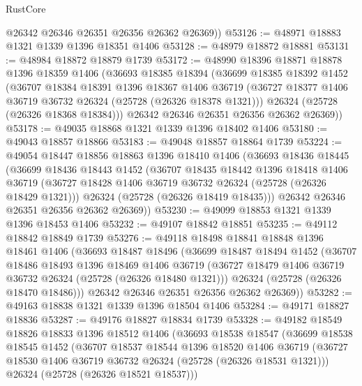\begin{lexlean}{RustCore}
\begin{coremodule}
        @26342
        @26346
        @26351
        @26356
        @26362
        @26369))
@53126 := @48971 @18883 @1321 @1339 @1396 @18351 @1406
@53128 := @48979 @18872 @18881
@53131 := @48984 @18872 @18879 @1739
@53172 := @48990
    @18396
    @18871
    @18878
    @1396
    @18359
    @1406
    (@36693
      @18385
      @18394
      (@36699
        @18385
        @18392
        @1452
        (@36707
          @18384
          @18391
          @1396
          @18367
          @1406
          @36719
          (@36727 @18377 @1406 @36719 @36732 @26324 (@25728 (@26326 @18378 @1321)))
          @26324
          (@25728 (@26326 @18368 @18384)))
        @26342
        @26346
        @26351
        @26356
        @26362
        @26369))
@53178 := @49035 @18868 @1321 @1339 @1396 @18402 @1406
@53180 := @49043 @18857 @18866
@53183 := @49048 @18857 @18864 @1739
@53224 := @49054
    @18447
    @18856
    @18863
    @1396
    @18410
    @1406
    (@36693
      @18436
      @18445
      (@36699
        @18436
        @18443
        @1452
        (@36707
          @18435
          @18442
          @1396
          @18418
          @1406
          @36719
          (@36727 @18428 @1406 @36719 @36732 @26324 (@25728 (@26326 @18429 @1321)))
          @26324
          (@25728 (@26326 @18419 @18435)))
        @26342
        @26346
        @26351
        @26356
        @26362
        @26369))
@53230 := @49099 @18853 @1321 @1339 @1396 @18453 @1406
@53232 := @49107 @18842 @18851
@53235 := @49112 @18842 @18849 @1739
@53276 := @49118
    @18498
    @18841
    @18848
    @1396
    @18461
    @1406
    (@36693
      @18487
      @18496
      (@36699
        @18487
        @18494
        @1452
        (@36707
          @18486
          @18493
          @1396
          @18469
          @1406
          @36719
          (@36727 @18479 @1406 @36719 @36732 @26324 (@25728 (@26326 @18480 @1321)))
          @26324
          (@25728 (@26326 @18470 @18486)))
        @26342
        @26346
        @26351
        @26356
        @26362
        @26369))
@53282 := @49163 @18838 @1321 @1339 @1396 @18504 @1406
@53284 := @49171 @18827 @18836
@53287 := @49176 @18827 @18834 @1739
@53328 := @49182
    @18549
    @18826
    @18833
    @1396
    @18512
    @1406
    (@36693
      @18538
      @18547
      (@36699
        @18538
        @18545
        @1452
        (@36707
          @18537
          @18544
          @1396
          @18520
          @1406
          @36719
          (@36727 @18530 @1406 @36719 @36732 @26324 (@25728 (@26326 @18531 @1321)))
          @26324
          (@25728 (@26326 @18521 @18537)))

\end{coremodule}
\end{lexlean}

